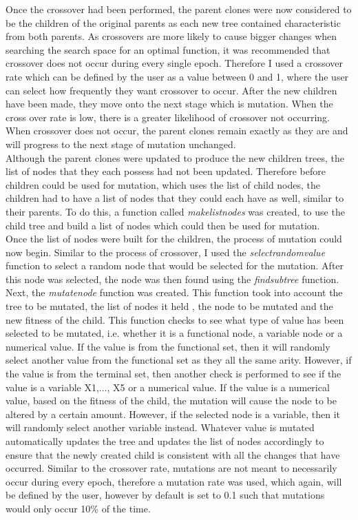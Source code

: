 \documentclass[11pt]{article}
\begin{document}
Once the crossover had been performed, the parent clones were now considered to be the children of the original parents as each new tree contained characteristic from both parents. As crossovers are more likely to cause bigger changes when searching the search space for an optimal function, it was recommended that crossover does not occur during every single epoch. Therefore I used a crossover rate which can be defined by the user as a value between 0 and 1, where the user can select how frequently they want crossover to occur. After the new children have been made, they move onto the next stage which is mutation.  When the cross over rate is low, there is a greater likelihood of crossover not occurring. When crossover does not occur, the parent clones remain exactly as they are and will progress to the next stage of mutation unchanged. \\

Although the parent clones were updated to produce the new children trees, the list of nodes that they each possess had not been updated. Therefore before children could be used for mutation, which uses the list of child nodes, the children had to have a list of nodes that they could each have as well, similar to their parents. To do this, a function called \textit{make\textunderscore list\textunderscore nodes} was created, to use the child tree and build a list of nodes which could then be used for mutation. \\
Once the list of nodes were built for the children, the process of mutation could now begin. Similar to the process of crossover, I used the \textit{select\textunderscore random\textunderscore value} function to select a random node that would be selected for the mutation. After this node was selected, the node was then found using the \textit{find\textunderscore subtree} function. Next, the \textit{mutate\textunderscore node} function was created. This function took into account the tree to be mutated, the list of nodes it held , the node to be mutated and the new fitness of the child. This function checks to see what type of value has been selected to be mutated, i.e. whether it is a functional node,  a variable node or a numerical value. If the value is from the functional set, then it will randomly select another value from the functional set as they all the same arity. However, if the value is from the terminal set, then another check is performed to see if the value is a variable X1,..., X5 or a numerical value. If the value is a numerical value, based on the fitness of the child, the mutation will cause the node to be altered by a certain amount. However, if the selected node is a variable, then it will randomly select another variable instead. Whatever value is mutated automatically updates the tree and updates the list of nodes accordingly to ensure that the newly created child is consistent with all the changes that have occurred. Similar to the crossover rate, mutations are not meant to necessarily occur during every epoch, therefore a mutation rate was used, which again, will be defined by the user, however by default is set to 0.1 such that mutations would only occur 10\% of the time. 
\end{document}
